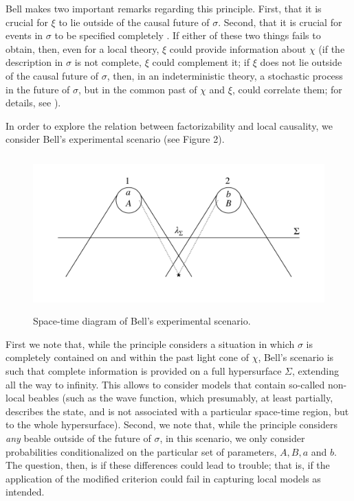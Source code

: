 \documentclass[letterpaper,12pt]{article}
\begin{document}
Bell makes two important remarks regarding this principle. First, that it is crucial for $\xi$ to lie outside of the causal future of $\sigma$. Second, that it is crucial for events in $\sigma$ to be specified completely \cite{Bell1990}. If either of these two things fails to obtain, then, even for a local theory, $\xi$ could provide information about $\chi$ (if the description in $\sigma$ is not complete, $\xi$ could complement it; if $\xi$ does not lie outside of the causal future of $\sigma$, then, in an indeterministic theory, a stochastic process in the future of $\sigma$, but in the common past of $\chi$ and $\xi$, could correlate them; for details, see \cite[p.16]{norsen2017}).

In order to explore the relation between factorizability and local causality, we consider Bell's experimental scenario (see Figure 2).
\begin{figure}[ht]
\centering
\includegraphics[height=6cm]{fig2.pdf} 
\caption{Space-time diagram of Bell's experimental scenario.}
\end{figure}
First we note that, while the principle considers a situation in which $\sigma$ is completely contained on and within the past light cone of $\chi$, Bell's scenario is such that complete information is provided on a full hypersurface $\Sigma$, extending all the way to infinity. This allows to consider models that contain so-called non-local beables (such as the wave function, which presumably, at least partially, describes the state, and is not associated with a particular space-time region, but to the whole hypersurface). Second, we note that, while the principle considers \emph{any} beable outside of the future of $\sigma$, in this scenario, we only consider probabilities conditionalized on the particular set of parameters, $A,B,a$ and $b$. The question, then, is if these differences could lead to trouble; that is, if the application of the modified criterion could fail in capturing local models as intended.
\end{document}
